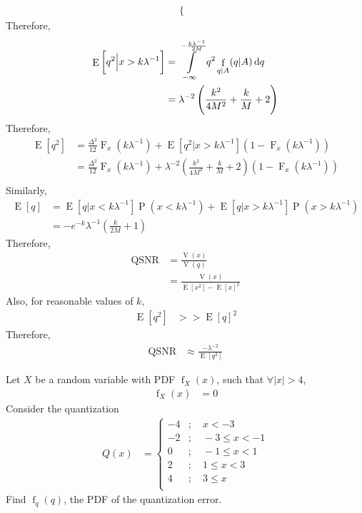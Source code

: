\documentclass[titlepage, fleqn, a4paper, 12pt, twoside]{article}
\theoremstyle{definition}
\theoremstyle{theorem}
\DeclareMathOperator{\cdf}{\mathrm{F}}
\DeclareMathOperator{\pdf}{\mathrm{f}}
\DeclareMathOperator{\prob}{\mathrm{P}}
\DeclareMathOperator{\expct}{\mathrm{E}}
\DeclareMathOperator{\var}{\mathrm{V}}
\DeclareMathOperator{\QSNR}{\mathrm{QSNR}}
\begin{document}
\begin{solution}
\begin{align*}
\begin{cases}
			\end{cases}
	\end{align*}
	Therefore,
	\begin{align*}
		\expct\left[ q^2 \Big| x > k \lambda^{-1} \right] &= \int\limits_{-\infty}^{-\frac{k \lambda^{-1}}{2 M}} q^2 \pdf_{q|A}(q|A) \dif q\\
		&= \lambda^{-2} \left( \frac{k^2}{4 M^2} + \frac{k}{M} + 2 \right)
	\end{align*}
	Therefore,
	\begin{align*}
		\expct\left[ q^2 \right] &= \frac{\Delta^2}{12} \cdf_x\left( k \lambda^{-1} \right) + \expct\left[ q^2 \Big| x > k \lambda^{-1} \right] \left( 1 - \cdf_x\left( k \lambda^{-1} \right) \right)\\
		&= \frac{\Delta^2}{12} \cdf_x\left( k \lambda^{-1} \right) + \lambda^{-2} \left( \frac{k^2}{4 M^2} + \frac{k}{M} + 2 \right) \left( 1 - \cdf_x\left( k \lambda^{-1} \right) \right)\\
	\end{align*}
	Similarly,
	\begin{align*}
		\expct[q] &= \expct\left[ q \Big| x < k \lambda^{-1} \right] \prob\left( x < k \lambda^{-1} \right) + \expct\left[ q \Big| x > k \lambda^{-1} \right] \prob\left( x > k \lambda^{-1} \right)\\
		&= -e^{-k} \lambda^{-1} \left( \frac{k}{2 M} + 1 \right)
	\end{align*}
	Therefore,
	\begin{align*}
		\QSNR &= \frac{\var(x)}{\var(q)}\\
		&= \frac{\var(x)}{\expct\left[ x^2 \right] - \expct[x]^2}
	\end{align*}
	Also, for reasonable values of $k$,
	\begin{align*}
		\expct\left[ q^2 \right] &>> \expct[q]^2
	\end{align*}
	Therefore,
	\begin{align*}
		\QSNR &\approx \frac{-\lambda^{-2}}{\expct\left[ q^2 \right]}
	\end{align*}
\end{solution}

\begin{question}
	Let $X$ be a random variable with PDF $\pdf_X(x)$, such that $\forall |x| > 4$,
	\begin{align*}
		\pdf_X(x) &= 0
	\end{align*}
	Consider the quantization
	\begin{align*}
		Q(x) &=
			\begin{cases}
				-4 &;\quad x < -3\\
				-2 &;\quad -3 \le x < -1\\
				0 &;\quad -1 \le x < 1\\
				2 &;\quad 1 \le x < 3\\
				4 &;\quad 3 \le x\\
			\end{cases}
	\end{align*}
	Find $\pdf_q(q)$, the PDF of the quantization error.
\end{question}
\end{document}
